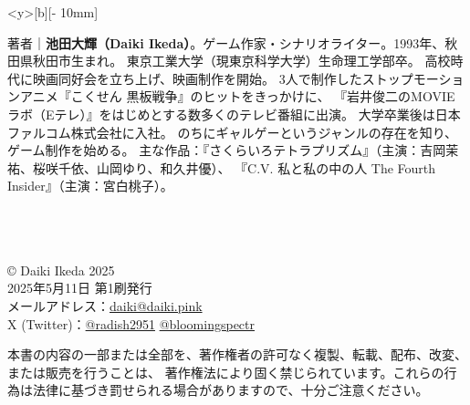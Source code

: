 
\cleardoublepage{}

\pagestyle{empty}

\begin{minipage}<y>[b][\textwidth - 10mm]{\textheight} %

\fontsize{7pt}{10pt}\selectfont %

著者｜\textbf{池田大輝（Daiki Ikeda）}。ゲーム作家・シナリオライター。1993年、秋田県秋田市生まれ。
東京工業大学（現東京科学大学）生命理工学部卒。
高校時代に映画同好会を立ち上げ、映画制作を開始。
3人で制作したストップモーションアニメ『こくせん 黒板戦争』のヒットをきっかけに、
『岩井俊二のMOVIEラボ（Eテレ）』をはじめとする数多くのテレビ番組に出演。
大学卒業後は日本ファルコム株式会社に入社。
のちにギャルゲーというジャンルの存在を知り、ゲーム制作を始める。
主な作品：『さくらいろテトラプリズム』（主演：吉岡茉祐、桜咲千依、山岡ゆり、和久井優）、
『C.V. 私と私の中の人 The Fourth Insider』（主演：宮白桃子）。

\vfill %

{\Large \booktitle}\\[1em]
{\large \booksubtitle}\\[1em]
{\normalsize \authorname}\\
\copyright{} Daiki Ikeda 2025\\[1em]
2025年5月11日 第1刷発行\\[1em]
メールアドレス：\url{daiki@daiki.pink}\\
X (Twitter)：\url{@radish2951} \url{@bloomingspectr}\\[1em]

\fontsize{6pt}{9pt}\selectfont %

本書の内容の一部または全部を、著作権者の許可なく複製、転載、配布、改変、または販売を行うことは、
著作権法により固く禁じられています。これらの行為は法律に基づき罰せられる場合がありますので、十分ご注意ください。

\end{minipage}
